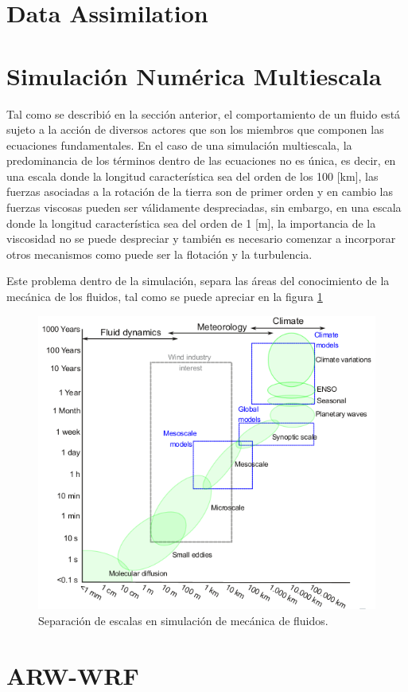 \section{Data Assimilation}


\section{Simulación Numérica Multiescala}
Tal como se describió en la sección anterior, el comportamiento de un fluido está sujeto a la acción de diversos actores que son los miembros que componen las ecuaciones fundamentales. En el caso de una simulación multiescala, la predominancia de los términos dentro de las ecuaciones no es única, es decir, en una escala donde la longitud característica sea del orden de los 100 [km], las fuerzas asociadas a la rotación de la tierra son de primer orden y en cambio las fuerzas viscosas pueden ser válidamente despreciadas, sin embargo, en una escala donde la longitud característica sea del orden de 1 [m], la importancia de la viscosidad no se puede despreciar y también es necesario comenzar a incorporar otros mecanismos como puede ser la flotación y la turbulencia.

Este problema dentro de la simulación, separa las áreas del conocimiento de la mecánica de los fluidos, tal como se puede apreciar en la figura \ref{fig:terraincog}

\begin{figure}[H]
\centering
\includegraphics[width=0.7\linewidth]{Imagenes/terraincog}
\caption{Separación de escalas en simulación de mecánica de fluidos.}
\label{fig:terraincog}
\end{figure}


\section{ARW-WRF}
